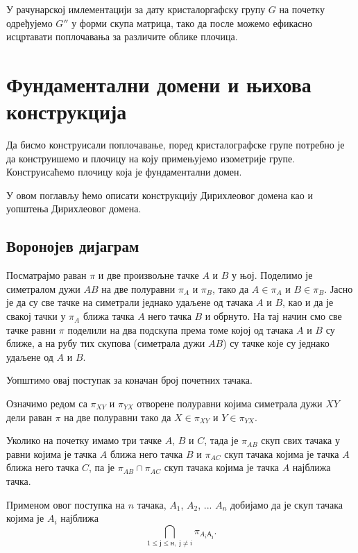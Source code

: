 \documentclass[12pt]{article}
\begin{document}
У рачунарској имлементацији за дату кристалоргафску групу $G$ на почетку одређујемо $G''$ у форми скупа матрица, тако да после можемо ефикасно исцртавати поплочавања за различите облике плочица.





\section{Фундаментални домени и њихова конструкција}\label{dirihleova-fundamentalna-oblast} 

Да бисмо конструисали поплочавање, поред кристалографске групе потребно је да конструишемо и плочицу на коју примењујемо изометрије групе. Конструисаћемо плочицу која је фундаментални домен.

У овом поглављу ћемо описати конструкцију Дирихлеовог домена као и уопштења Дирихлеовог домена.
\subsection{Воронојев дијаграм}


Посматрајмо раван $\pi$ и две произвољне тачке $A$ и $B$ у њој. Поделимо је симетралом дужи $AB$ на две полуравни $\pi _A$ и $\pi _B$, тако да $A \in \pi _ A$ и $B \in \pi _B$. Јасно је да су све тачке на симетрали једнако удаљене од тачака $A$ и $B$, као и да је свакој тачки у $\pi _A$ ближа тачка $A$ него тачка $B$ и обрнуто. 
На тај начин смо све тачке равни $\pi$ поделили на два подскупа према томе којој од тачака $A$ и $B$ су ближе, а на рубу тих скупова (симетрала дужи $AB$) су тачке које су једнако удаљене од $A$ и $B$.

Уопштимо овај поступак за коначан број почетних тачака.

Означимо редом са $\pi _{XY}$ и $\pi _{YX}$ отворене полуравни којима симетрала дужи $XY$ дели раван $\pi$ на две полуравни тако да $X \in \pi _ {XY}$ и $Y \in \pi _{YX}$. 

Уколико на почетку имамо три тачке $A$, $B$ и $C$, тада је $\pi _{AB}$ скуп свих тачака у равни којима је тачка $A$ ближа него тачка $B$ и $\pi _{AC}$ скуп тачака којима је тачка $A$ ближа него тачка $C$, па је $\pi _{AB} \cap \pi _{AC}$ скуп тачака којима је тачка $A$ најближа тачка.

Применом овог поступка на  $n$ тачака, $A_1$, $A_2$, ... $A_n$ добијамо да је скуп тачака којима је $A_i$ најближа   $$\bigcap _{1\leq ј\leq н,\; ј\neq i} \pi_{A_i А_ј}.$$
\end{document}
